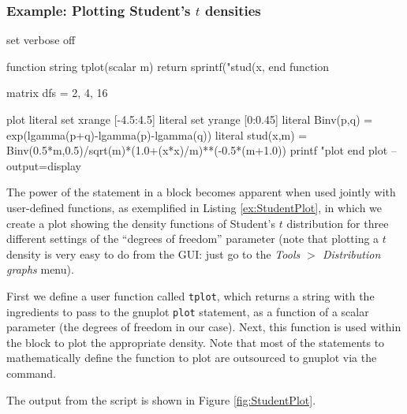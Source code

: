 \subsubsection{Example: Plotting Student's $t$ densities}

\begin{script}[htbp]
  \label{ex:StudentPlot}
\begin{scode}
set verbose off

function string tplot(scalar m)
    return sprintf("stud(x,%
end function

matrix dfs = {2, 4, 16}

plot
    literal set xrange [-4.5:4.5]
    literal set yrange [0:0.45]
    literal Binv(p,q) = exp(lgamma(p+q)-lgamma(p)-lgamma(q))
    literal stud(x,m) = Binv(0.5*m,0.5)/sqrt(m)*(1.0+(x*x)/m)**(-0.5*(m+1.0))
    printf "plot %
end plot --output=display
\end{scode}
\end{script}

The power of the  statement in a  block becomes
apparent when used jointly with user-defined functions, as exemplified
in Listing \ref{ex:StudentPlot}, in which we create a plot showing
the density functions of Student's $t$ distribution for three
different settings of the ``degrees of freedom'' parameter (note that
plotting a $t$ density is very easy to do from the GUI: just go to the
\emph{Tools $>$ Distribution graphs} menu).

First we define a user function called \texttt{tplot}, which returns a
string with the ingredients to pass to the gnuplot \texttt{plot}
statement, as a function of a scalar parameter (the degrees of freedom
in our case). Next, this function is used within the  block
to plot the appropriate density. Note that most of the 
statements to mathematically define the function to plot are
outsourced to gnuplot via the  command.

The output from the script is shown in Figure \ref{fig:StudentPlot}.


